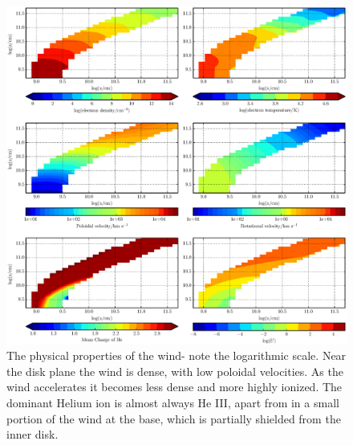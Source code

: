 \documentclass[preprint, a4paper, 11pt]{aastex}
\begin{document}




\begin{figure} %
\includegraphics[width=\textwidth]{figures/fig5.eps}
\caption{
The physical properties of the wind- note the logarithmic scale. 
Near the disk plane the wind is dense, with low poloidal velocities.
As the wind accelerates it becomes less dense
and more highly ionized. The dominant Helium ion
is almost always He III, apart from in a small
portion of the wind at the base, which is partially shielded
from the inner disk.
}
\label{wind}
\end{figure} %






\end{document}
